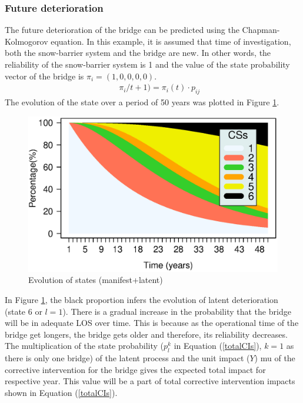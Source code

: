 \documentclass[fleqn]{article}
\begin{document}
\subsubsection{Future deterioration}
The future deterioration of the bridge can be predicted using the Chapman-Kolmogorov equation. In this example, it is assumed that time of investigation, both the snow-barrier system and the bridge are new. In other words, the reliability of the snow-barrier system is 1 and the value of the state probability vector of the bridge is $\pi_i=(1,0,0,0,0)$. 
\begin{eqnarray}
&& \pi_i/t+1) = \pi_i(t)\cdot p_{ij} \label{delta}
\end{eqnarray}
The evolution of the state over a period of 50 years was plotted in Figure \ref{csevolution}. 

\begin{figure}[H]
  \begin{center}
    \includegraphics[width=0.8\linewidth]{csevolution}
    \caption{Evolution of states (manifest+latent)}
    \label{csevolution}
  \end{center}
\end{figure}

In Figure \ref{csevolution}, the black proportion infers the evolution of latent deterioration (state 6 or $l=1$). There is a gradual increase in the probability that the bridge will be in adequate LOS over time. This is because as the operational time of the bridge get longers, the bridge gets older and therefore, its reliability decreases. The multiplication of the state probability ($p_l^k$ in Equation (\ref{totalCIs}), $k=1$ as there is only one bridge) of the latent process and the unit impact ($Y$) mu of the corrective intervention for the bridge gives the expected total impact for respective year. This value will be a part of total corrective intervention impacts shown in Equation (\ref{totalCIs}).
\end{document}
